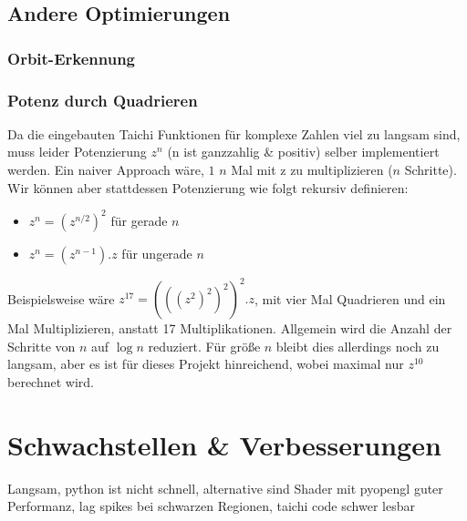 \documentclass{article}
\begin{document}
\subsection{Andere Optimierungen}
\subsubsection{Orbit-Erkennung}
\subsubsection{Potenz durch Quadrieren}
Da die eingebauten Taichi Funktionen für komplexe Zahlen viel zu langsam sind, muss leider Potenzierung $z^n$ (n ist ganzzahlig \& positiv) selber implementiert werden. Ein naiver Approach wäre, $1$ $n$ Mal mit z zu multiplizieren ($n$ Schritte). Wir können aber stattdessen Potenzierung wie folgt rekursiv definieren: 
\begin{itemize}
\item $z^n = (z^{n/2})^2$ für gerade $n$ 
\item $z^n = (z^{n-1}).z$ für ungerade $n$
\end{itemize}
Beispielsweise wäre $z^{17} = (((z^2)^2)^2)^2 . z$, mit vier Mal Quadrieren und ein Mal Multiplizieren, anstatt 17 Multiplikationen. Allgemein wird die Anzahl der Schritte von $n$ auf $\log n$ reduziert. Für größe $n$ bleibt dies allerdings noch zu langsam, aber es ist für dieses Projekt hinreichend, wobei maximal nur $z^{10}$ berechnet wird.

\section{Schwachstellen \& Verbesserungen}
Langsam, python ist nicht schnell, alternative sind Shader mit pyopengl guter Performanz, lag spikes bei schwarzen Regionen, taichi code schwer lesbar
\printbibliography
\end{document}
